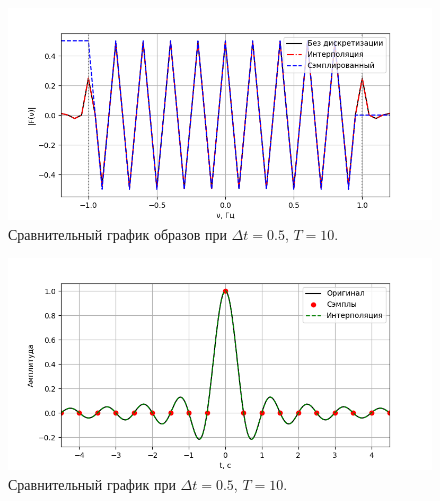 \documentclass[a4paper]{article}
\begin{document}
\begin{figure}[H]
  \centering
  \includegraphics[width=\textwidth]{src/task_2/2_freq_10_0.5.png}
  \caption{Сравнительный график образов при $\Delta t=0.5$, $T=10$.} 
\end{figure}
\begin{figure}[H]
  \centering
  \includegraphics[width=\textwidth]{src/task_2/2_time_10_0.5.png}
  \caption{Сравнительный график при $\Delta t=0.5$, $T=10$.} 
\end{figure}
\end{document}
